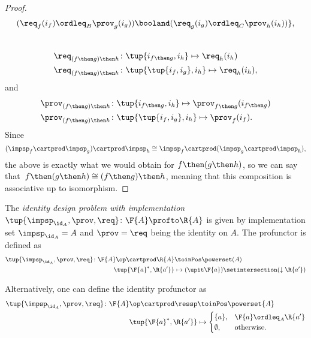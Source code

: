 {\begin{proof}
\begin{equation}
\begin{aligned}
				(\req_f(i_f) \ordleq_{B} \prov_g(i_g))
				\booland
				(\req_g(i_g) \ordleq_{C} \prov_h(i_h))
				\},
			\end{aligned}
		\end{equation}
		~
		\begin{equation}
			\begin{aligned}
				\req_{(f\then g)\then h} & \colon  \tup{i_{f\then g},i_h} \mapsto \req_h(i_h)    \\
				\req_{(f\then g)\then h} & \colon  \tup{\tup{i_f, i_g},i_h} \mapsto \req_h(i_h),
			\end{aligned}
		\end{equation}
		and
		\begin{equation}
			\begin{aligned}
				\prov_{(f\then g)\then h} & \colon  \tup{i_{f\then g},i_h} \mapsto \prov_{f\then g}(i_{f\then g}) \\
				\prov_{(f\then g)\then h} & \colon  \tup{\tup{i_f, i_g},i_h} \mapsto \prov_f(i_f).
			\end{aligned}
		\end{equation}
		Since
		\begin{equation}
			(\impsp_f \cartprod \impsp_g)
			\cartprod \impsp_{h} \cong  \impsp_f \cartprod (\impsp_g \cartprod \impsp_{h}),
		\end{equation}
		the above is exactly what we would obtain for $f\then (g\then h)$, so we can say that~$f\then(g\then h)\cong (f\then g)\then h$, meaning that this composition is associative up to isomorphism.
	\end{proof}

	\begin{definition}
		\label{def:identitydpi}
		The \emph{identity design problem with implementation}~$\tup{\impsp_{\id_A},\prov,\req} \colon \F{A} \profto \R{A}$ is given by implementation set $\impsp_{\id_A} = A$ and $\prov=\req$ being the identity on $A$.
		The profunctor is defined as
		\begin{align}
			\tup{\impsp_{\id_A},\prov,\req} \colon \F{A}\op \cartprod \R{A} & \toinPos \powerset(A)                                      \\
			\tup{\F{a}^*,\R{a'}}                                            & \mapsto (\upit \F{a}) \setintersection (\downarrow \R{a'})
		\end{align}
	\end{definition}
	\begin{remark}
		Alternatively, one can define the identity profunctor as
		\begin{align}
			\tup{\impsp_{\id_A},\prov,\req}\colon \F{A}\op \cartprod \ressp & \toinPos \powerset{A} \\
			\tup{\F{a}^*,\R{a'}}                                            & \mapsto
			\begin{cases}
				\{a\},     & \F{a}\ordleq_A \R{a'} \\
				\emptyset, & \text{otherwise}.
			\end{cases}
		\end{align}
	\end{remark}

}
